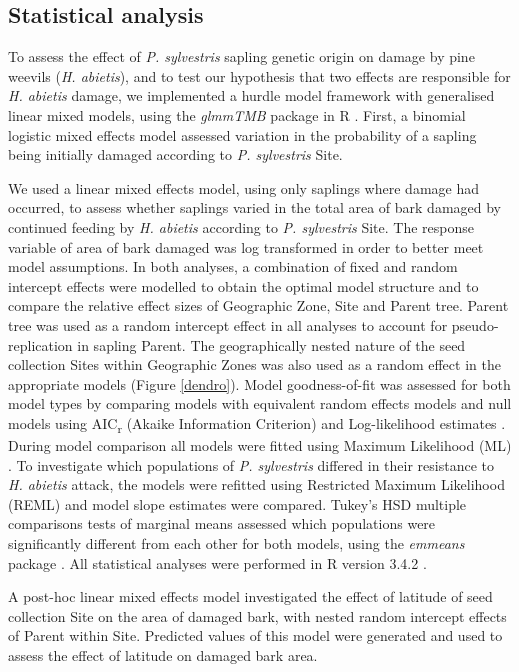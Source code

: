\documentclass[a4paper, 11pt]{article}
\begin{document}
\subsection*{Statistical analysis}

To assess the effect of \textit{P. sylvestris} sapling genetic origin on damage by pine weevils (\textit{H. abietis}), and to test our hypothesis that two effects are responsible for \textit{H. abietis} damage, we implemented a hurdle model framework with generalised linear mixed models, using the \textit{glmmTMB} package in R \citep{glmmTMB}. First, a binomial logistic mixed effects model assessed variation in the probability of a sapling being initially damaged  according to \textit{P. sylvestris} Site.

We used a linear mixed effects model, using only saplings where damage had occurred, to assess whether saplings varied in the total area of bark damaged by continued feeding by \textit{H. abietis} according to \textit{P. sylvestris} Site. The response variable of area of bark damaged was log transformed in order to better meet model assumptions. In both analyses, a combination of fixed and random intercept effects were modelled to obtain the optimal model structure and to compare the relative effect sizes of Geographic Zone, Site and Parent tree. Parent tree was used as a random intercept effect in all analyses to account for pseudo-replication in sapling Parent. The geographically nested nature of the seed collection Sites within Geographic Zones was also used as a random effect in the appropriate models (Figure \ref{dendro}). Model goodness-of-fit was assessed for both model types by comparing models with equivalent random effects models and null models using AIC\textsubscript{r} (Akaike Information Criterion) and Log-likelihood estimates \citep{Bolker2008}. During model comparison all models were fitted using Maximum Likelihood (ML) \citep{Bolker2008}. To investigate which populations of \textit{P. sylvestris} differed in their resistance to \textit{H. abietis} attack, the models were refitted using Restricted Maximum Likelihood (REML) and model slope estimates were compared. Tukey's HSD multiple comparisons tests of marginal means assessed which populations were significantly different from each other for both models, using the \textit{emmeans} package \citep{Russell2019}. All statistical analyses were performed in R version 3.4.2 \citep{RCoreTeam2019}. 

A post-hoc linear mixed effects model investigated the effect of latitude of seed collection Site on the area of damaged bark, with nested random intercept effects of Parent within Site. Predicted values of this model were generated and used to assess the effect of latitude on damaged bark area. 
\end{document}
